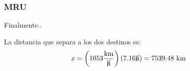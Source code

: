 \documentclass{beamer}
\begin{document}
\begin{frame}
\frametitle{MRU}
% 

\begin{center}
\end{center}


Finalmente..

 
La distancia que separa a los dos destinos es:
{\large
\begin{equation}
x=
\left(1053\frac{\text{km}}{\cancel{\text{h}}}\right)
(7.16\cancel{\text{h}})=
7539.48~\text{km}
\end{equation}}

                                                             
\end{frame}

\end{document}
